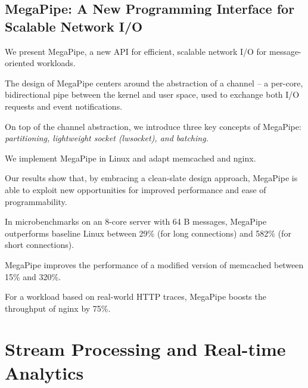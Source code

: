 \documentclass[a4paper,11pt]{article}
\begin{document}
\subsection*{MegaPipe: A New Programming Interface for Scalable Network I/O}
{\color{cyan} {\color{magenta}}

We present 
MegaPipe\cite{megapipe}, 
a new API for efficient, scalable network I/O for message-oriented workloads. 

The design of MegaPipe centers around the abstraction of a channel –
a per-core, bidirectional pipe between the kernel and user space, 
used to exchange both I/O requests and event notifications.

On top of the channel abstraction, we introduce
three key concepts of MegaPipe: 
{\color{red} \em partitioning, lightweight socket (lwsocket), and batching.}

We implement MegaPipe in Linux and adapt memcached and nginx. 

Our results show that, by embracing a clean-slate design approach, 
MegaPipe is able to exploit new opportunities for improved performance and ease of programmability. 

In microbenchmarks on an 8-core server with 64 B messages, 
MegaPipe outperforms baseline Linux between 29\% (for long connections) and 582\% (for short connections). 

MegaPipe improves the performance of a modified version of memcached between 15\% and 320\%. 

For a workload based on real-world HTTP traces, 
MegaPipe boosts the throughput of nginx by 75\%.

}


\section{Stream Processing and Real-time Analytics}
\end{document}
